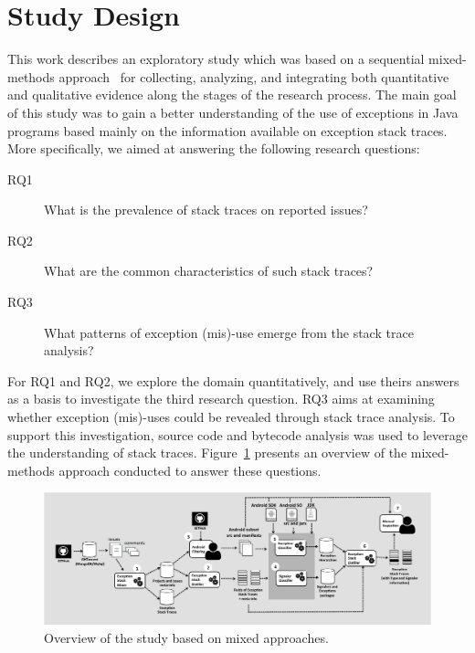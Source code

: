 \documentclass[conference]{IEEEtran}
\begin{document}
\section{Study Design}

This work describes an exploratory study which was based on a sequential
mixed-methods approach~\cite{ivankova2006using} for collecting, analyzing, and
integrating both quantitative and qualitative evidence along the stages of the
research process. The main goal of this study was to gain a better understanding
of the use of exceptions in Java programs based mainly on the information
available on exception stack traces. More specifically, we aimed at answering
the following research questions:

\begin{description}

  \item[RQ1] What is the prevalence of stack traces on  reported issues?

  \item[RQ2] What are the common characteristics of such stack traces?

  \item[RQ3] What patterns of exception (mis)-use emerge from the stack trace
    analysis?

\end{description}

For RQ1 and RQ2, we explore the domain quantitatively, and use theirs answers as
a basis to investigate the third research question. RQ3 aims at examining whether
exception (mis)-uses could be revealed through stack trace analysis. To
support this investigation, source code and bytecode analysis was used to
leverage the  understanding of stack traces. 
Figure~\ref{fig:overviewfig} presents an overview of the mixed-methods approach
conducted to answer these questions.

\begin{figure}
\centering
\includegraphics[width=\hsize]{overview.pdf}
\caption{Overview of the study based on mixed approaches.}
\label{fig:overviewfig}
\end{figure}
\end{document}
